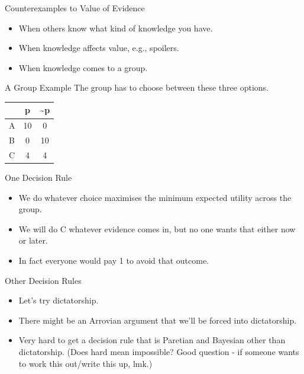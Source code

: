 \documentclass[
  ignorenonframetext,
]{beamer}
\providecommand{\tightlist}{%
  \setlength{\itemsep}{0pt}\setlength{\parskip}{0pt}}
\begin{document}
\begin{frame}{Counterexamples to Value of Evidence}
\protect\hypertarget{counterexamples-to-value-of-evidence}{}
\begin{itemize}[<+->]
\tightlist
\item
  When others know what kind of knowledge you have.
\item
  When knowledge affects value, e.g., spoilers.
\item
  When knowledge comes to a group.
\end{itemize}
\end{frame}

\begin{frame}{A Group Example}
\protect\hypertarget{a-group-example}{}
The group has to choose between these three options.

\begin{longtable}[]{@{}lcc@{}}
\toprule
& p & \textasciitilde p \\
\midrule
\endhead
A & 10 & 0 \\
B & 0 & 10 \\
C & 4 & 4 \\
\bottomrule
\end{longtable}
\end{frame}

\begin{frame}{One Decision Rule}
\protect\hypertarget{one-decision-rule}{}
\begin{itemize}[<+->]
\tightlist
\item
  We do whatever choice maximises the minimum expected utility across
  the group.
\item
  We will do C whatever evidence comes in, but no one wants that either
  now or later.
\item
  In fact everyone would pay 1 to avoid that outcome.
\end{itemize}
\end{frame}

\begin{frame}{Other Decision Rules}
\protect\hypertarget{other-decision-rules}{}
\begin{itemize}
\tightlist
\item
  Let's try dictatorship.
\item
  There might be an Arrovian argument that we'll be forced into
  dictatorship.
\item
  Very hard to get a decision rule that is Paretian and Bayesian other
  than dictatorship. (Does hard mean impossible? Good question - if
  someone wants to work this out/write this up, lmk.)
\end{itemize}
\end{frame}
\end{document}
